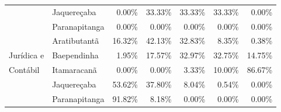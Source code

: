 \begin{table}[h]
\begin{tabular}{ll rrrrr}
                          & Jaquereçaba             &               0.00\% &        33.33\% &       33.33\% &      33.33\% &             0.00\% \\ 
                          & Paranapitanga           &               0.00\% &         0.00\% &        0.00\% &       0.00\% &             0.00\% \\ 
 \midrule{}                                                                                                                          
						  & Aratibutantã            &              16.32\% &        42.13\% &       32.83\% &       8.35\% &             0.38\% \\ 
    Jurídica e         	  & Baependinha             &               1.95\% &        17.57\% &       32.97\% &      32.75\% &            14.75\% \\ 
	Contábil			  & Itamaracanã             &               0.00\% &         0.00\% &        3.33\% &      10.00\% &            86.67\% \\ 
						  & Jaquereçaba             &              53.62\% &        37.80\% &        8.04\% &       0.54\% &             0.00\% \\ 
                          & Paranapitanga           &              91.82\% &         8.18\% &        0.00\% &       0.00\% &             0.00\% \\ 
   \bottomrule
\end{tabular}
\label{tabela:q15p}
\end{table}

